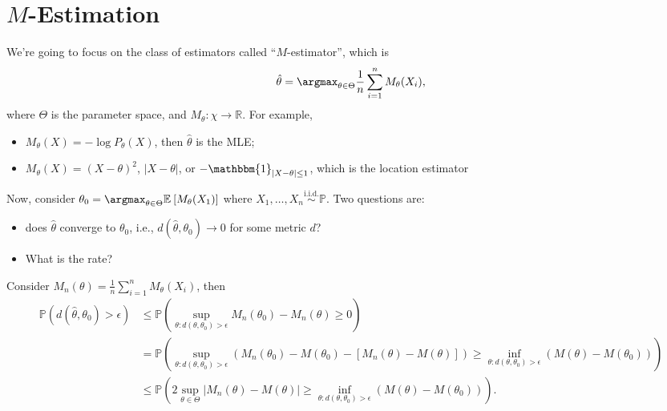 \section{\(M\)-Estimation}
We're going to focus on the class of estimators called ``\(M\)-estimator'', which is
\[
	\hat{\theta} = \argmax_{\theta \in \Theta } \frac{1}{n} \sum_{i=1}^{n} M_\theta (X_i),
\]
where \(\Theta \) is the parameter space, and \(M_\theta \colon \chi \to \mathbb{R} \). For example,
\begin{itemize}
	\item \(M_\theta (X) = - \log P_\theta (X)\), then \(\hat{\theta} \) is the MLE;
	\item \(M_\theta (X) = (X-\theta )^2\),  \(\vert X - \theta  \vert\), or \(- \mathbbm{1}_{\vert X - \theta  \vert \leq 1} \), which is the location estimator
\end{itemize}

Now, consider \(\theta _0 = \argmax_{\theta \in \Theta } \mathbb{E}_{}\left[M_\theta (X_1) \right] \) where \(X_1, \dots , X_n \overset{\text{i.i.d.} }{\sim }\mathbb{P} \). Two questions are:
\begin{itemize}
	\item does \(\hat{\theta} \) converge to \(\theta _0\), i.e., \(d(\hat{\theta} , \theta _0)\to 0\) for some metric \(d\)?
	\item What is the rate?
\end{itemize}

Consider \(M_n(\theta ) = \frac{1}{n} \sum_{i=1}^{n} M_\theta (X_i)\), then
\[
	\begin{split}
		\mathbb{P} (d(\hat{\theta} , \theta _0) > \epsilon )
		&\leq \mathbb{P} \left( \sup _{\theta \colon d(\theta , \theta _0) > \epsilon } M_n(\theta _0) - M_n(\theta ) \geq 0\right) \\
		&= \mathbb{P} \left( \sup _{\theta \colon d(\theta , \theta _0) > \epsilon } \left( M_n(\theta _0) - M(\theta _0) - [M_n(\theta ) - M(\theta )] \right) \geq \inf _{\theta \colon d(\theta , \theta _0) > \epsilon } (M(\theta ) - M(\theta _0)) \right) \\
		&\leq \mathbb{P} \left( 2 \sup_{\theta \in \Theta } \vert M_n(\theta ) - M(\theta ) \vert \geq \inf _{\theta \colon d(\theta , \theta _0) > \epsilon } (M(\theta ) - M(\theta _0)) \right) .
	\end{split}
\]